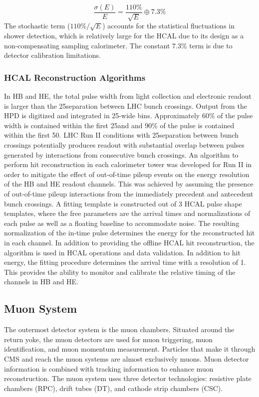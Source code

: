 \begin{equation}
\frac{\sigma(E)}{E}=\frac{110\%}{\sqrt{E}} \oplus 7.3\%
\label{eq:cms:hcal_res}
\end{equation}
The stochastic term (${110\%}/\sqrt{E}$) accounts for the statistical fluctuations in shower detection, which is relatively large for the HCAL due to its design as a non-compensating sampling calorimeter. The constant $7.3\%$ term is due to detector calibration limitations.

\subsubsection{HCAL Reconstruction Algorithms}
In HB and HE, the total pulse width from light collection and electronic readout is larger than the 25\ns separation between LHC bunch crossings. Output from the HPD is digitized and integrated in 25\ns-wide bins. Approximately 60\% of the pulse width is contained within the first 25\ns and and 90\% of the pulse is contained within the first 50\ns. LHC Run II conditions with 25\ns separation between bunch crossings potentially produces readout with substantial overlap between pulses generated by interactions from consecutive bunch crossings. An algorithm to perform hit reconstruction in each calorimeter tower was developed for Run II in order to mitigate the effect of out-of-time pileup events on the energy resolution of the HB and HE readout channels. This was achieved by assuming the presence of out-of-time pileup interactions from the immediately precedent and antecedent bunch crossings. A fitting template is constructed out of 3 HCAL pulse shape templates, where the free parameters are the arrival times and normalizations of each pulse as well as a floating baseline to accommodate noise. The resulting normalization of the in-time pulse determines the energy for the reconstructed hit in each channel. 
In addition to providing the offline HCAL hit reconstruction, the algorithm is used in HCAL operations and data validation. In addition to hit energy, the fitting procedure determines the arrival time with a resolution of 1\ns. This provides the ability to monitor and calibrate the relative timing of the channels in HB and HE. 
\subsection{Muon System}\label{ch:cms:muons}
The outermost detector system is the muon chambers. Situated around the return yoke, the muon detectors are used for muon triggering, muon identification, and muon momentum measurement. Particles that make it through CMS and reach the muon systems are almost exclusively muons. Muon detector information is combined with tracking information to enhance muon reconstruction.
The muon system uses three detector technologies: resistive plate chambers (RPC), drift tubes (DT), and cathode strip chambers (CSC)\cite{CMS:1997iti}. 

